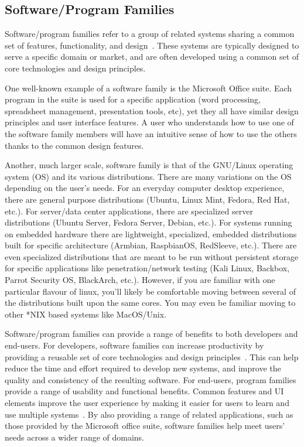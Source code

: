 \subsection{Software/Program Families}

Software/program families refer to a group of related systems sharing a common 
set of features, functionality, and design~\cite{Pohl2005}. These systems are 
typically designed to serve a specific domain or market, and are often 
developed using a common set of core technologies and design principles.

One well-known example of a software family is the Microsoft Office suite. Each 
program in the suite is used for a specific application (word 
processing, spreadsheet management, presentation tools, etc), yet they all have 
similar design principles and user interface features. A user who understands 
how to use one of the software family members will have an intuitive sense of 
how to use the others thanks to the common design features. 

Another, much larger scale, software family is that of the GNU/Linux operating 
system (OS) and its various distributions. There are many variations on the OS 
depending on the user's needs. For an everyday computer desktop experience, 
there are general purpose distributions (Ubuntu, Linux Mint, Fedora, Red 
Hat, etc.). For server/data center applications, there are specialized server 
distributions (Ubuntu Server, Fedora Server, Debian, etc.). For systems running 
on embedded hardware there are lightweight, specialized, embedded distributions 
built for specific architecture (Armbian, RaspbianOS, RedSleeve, etc.). There 
are even specialized distributions that are meant to be run without persistent 
storage for specific applications like penetration/network testing (Kali Linux, 
Backbox, Parrot Security OS, BlackArch, etc.). However, if you are familiar 
with one particular flavour of linux, you'll likely be comfortable moving 
between several of the distributions built upon the same cores. You may even be 
familiar moving to other *NIX based systems like MacOS/Unix.

Software/program families can provide a range of benefits to both developers 
and end-users. For developers, software families can increase 
productivity by providing a reusable set of core technologies and design 
principles~\cite{Pohl2005}. This can help reduce the time and effort required 
to develop new systems, and improve the quality and consistency of the 
resulting software. For end-users, program families provide a range of 
usability and functional benefits. Common features and UI elements improve the 
user experience by making it easier for users to learn and use multiple 
systems~\cite{Bosch2000}. By also providing a range of related 
applications, such as those provided by the Microsoft office suite, software 
families help meet users' needs across a wider range of domains.

